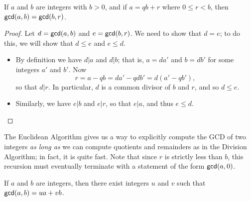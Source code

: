 \begin{prop}
If \(a\) and \(b\) are integers with \(b > 0\), and if \(a = qb + r\) where \(0 \leq r < b\), then \(\mathsf{gcd}(a, b) = \mathsf{gcd}(b, r)\).
\end{prop}

\begin{proof}
Let \(d = \mathsf{gcd}(a, b)\) and \(e = \mathsf{gcd}(b, r)\). We need to show that \(d = e\); to do this, we will show that \(d \leq e\) and \(e \leq d\).
\begin{itemize}
\item By definition we have \(d|a\) and \(d|b\); that is, \(a = da'\) and \(b = db'\) for some integers \(a'\) and \(b'\). Now \[ r = a - qb = da' - qdb' = d(a' - qb'), \] so that \(d|r\). In particular, \(d\) is a common divisor of \(b\) and \(r\), and so \(d \leq e\).
\item Similarly, we have \(e|b\) and \(e|r\), so that \(e|a\), and thus \(e \leq d\). \qedhere
\end{itemize}
\end{proof}

The Euclidean Algorithm gives us a way to explicitly compute the GCD of two integers \emph{as long as} we can compute quotients and remainders as in the Division Algorithm; in fact, it is quite fast. Note that since \(r\) is strictly less than \(b\), this recursion must eventually terminate with a statement of the form \(\mathsf{gcd}(a, 0)\).


\begin{thm}
If \(a\) and \(b\) are integers, then there exist integers \(u\) and \(v\) such that \(\mathsf{gcd}(a, b) = ua + vb\).
\end{thm}

